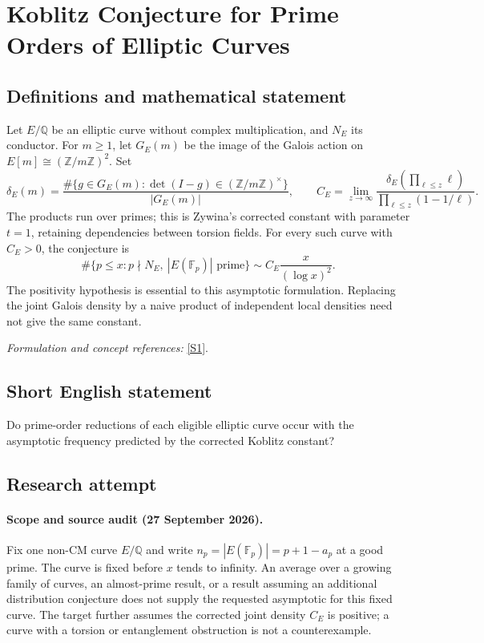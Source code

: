 \documentclass[11pt]{article}
\begin{document}
\section*{\texorpdfstring{Koblitz Conjecture for Prime Orders of Elliptic Curves}{Koblitz Conjecture for Prime Orders of Elliptic Curves}}\label{statement}
\subsection{Definitions and mathematical statement}
Let $E/{\mathbb{Q}}$ be an elliptic curve without complex multiplication, and $N_E$ its conductor. For $m\ge1$, let $G_E(m)$ be the image of the Galois action on $E[m]\cong({\mathbb{Z}}/m{\mathbb{Z}})^2$. Set
\[
 \delta_E(m)=\frac{\#\{g\in G_E(m):\det(I-g)\in({\mathbb{Z}}/m{\mathbb{Z}})^\times\}}
 {|G_E(m)|},
 \qquad
 C_E=\lim_{z\to\infty}
 \frac{\delta_E(\prod_{\ell\le z}\ell)}{\prod_{\ell\le z}(1-1/\ell)}.
\]
The products run over primes; this is Zywina's corrected constant with parameter $t=1$, retaining dependencies between torsion fields. For every such curve with $C_E>0$, the conjecture is
\[
 \#\{p\le x:p\nmid N_E,\ |E({\mathbb{F}}_p)|\text{ prime}\}
       \sim C_E\frac{x}{(\log x)^2}.
\]
The positivity hypothesis is essential to this asymptotic formulation. Replacing the joint Galois density by a naive product of independent local densities need not give the same constant.
\par\smallskip\textit{Formulation and concept references:} \href{https://arxiv.org/abs/0909.5280}{[S1]}.

\subsection{Short English statement}
Do prime-order reductions of each eligible elliptic curve occur with the asymptotic frequency predicted by the corrected Koblitz constant?
\subsection{Research attempt}

\paragraph{Scope and source audit (27 September 2026).}
Fix one non-CM curve $E/\mathbb Q$ and write
$n_p=|E(\mathbb F_p)|=p+1-a_p$ at a good prime. The curve is fixed before
$x$ tends to infinity. An average over a growing family of curves, an
almost-prime result, or a result assuming an additional distribution
conjecture does not supply the requested asymptotic for this fixed curve.
The target further assumes the corrected joint density $C_E$ is positive;
a curve with a torsion or entanglement obstruction is not a counterexample.
\end{document}

